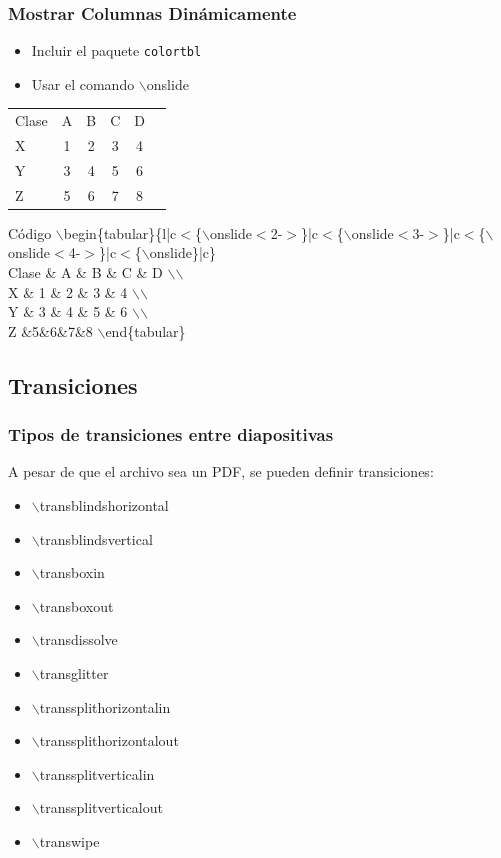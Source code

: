 \documentclass[aspectratio=1610]{beamer}%
\begin{document}
\begin{frame}
\frametitle{\textbf{Mostrar Columnas Dinámicamente}}
\justifying
 \begin{itemize}\justifying
  \item Incluir el paquete \texttt{colortbl}
  \item Usar el comando $\backslash$onslide
\end{itemize}

\begin{center}
\begin{tabular}{l|c<{\onslide<2->}|c<{\onslide<3->}|c<{\onslide<4->}|c<{\onslide}|c}
Clase & A & B & C & D \\ 
X & 1 & 2 & 3 & 4 \\ 
Y & 3 & 4 & 5 & 6 \\ 
Z &5&6&7&8 
\end{tabular}
\end{center}

\begin{exampleblock}{Código}
$\backslash$begin\{tabular\}\{l|c$<$\{$\backslash$onslide$<$2-$>$\}|c$<$\{$\backslash$onslide$<$3-$>$\}|c$<$\{$\backslash$onslide$<$4-$>$\}|c$<$\{$\backslash$onslide\}|c\}\\
Clase \& A \& B \& C \& D $\backslash$$\backslash$\\ 
X \& 1 \& 2 \& 3 \& 4 $\backslash$$\backslash$\\ 
Y \& 3 \& 4 \& 5 \& 6 $\backslash$$\backslash$\\ 
Z \&5\&6\&7\&8 
$\backslash$end\{tabular\}
\end{exampleblock}

\end{frame}

\subsection{Transiciones}
\begin{frame}[fragile]
\frametitle{\textbf{Tipos de transiciones entre diapositivas}}
\justifying
 A pesar de que el archivo sea un PDF, se pueden definir transiciones:
 \begin{itemize}\justifying
  \item $\backslash$transblindshorizontal
  \item $\backslash$transblindsvertical
  \item $\backslash$transboxin
  \item $\backslash$transboxout
  \item $\backslash$transdissolve
  \item $\backslash$transglitter
  \item $\backslash$transsplithorizontalin
  \item $\backslash$transsplithorizontalout
  \item $\backslash$transsplitverticalin
  \item $\backslash$transsplitverticalout
  \item $\backslash$transwipe
\end{itemize}

\end{frame}
\transdissolve
\end{document}
